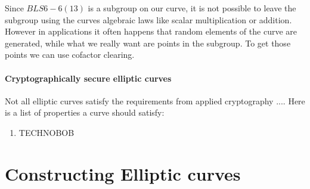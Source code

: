 \begin{definition}
Since $BLS6-6(13)$ is a subgroup on our curve, it is not possible to leave the subgroup using the curves algebraic laws like scalar multiplication or addition. However in applications it often happens that random elements of the curve are generated, while what we really want are points in the subgroup. To get those points we can use cofactor clearing.
\end{definition}

\paragraph{Cryptographically secure elliptic curves} Not all elliptic curves satisfy the requirements from applied cryptography .... Here is a list of properties a curve should satisfy:

\begin{enumerate}
\item TECHNOBOB
\end{enumerate}

\section{Constructing Elliptic curves}
